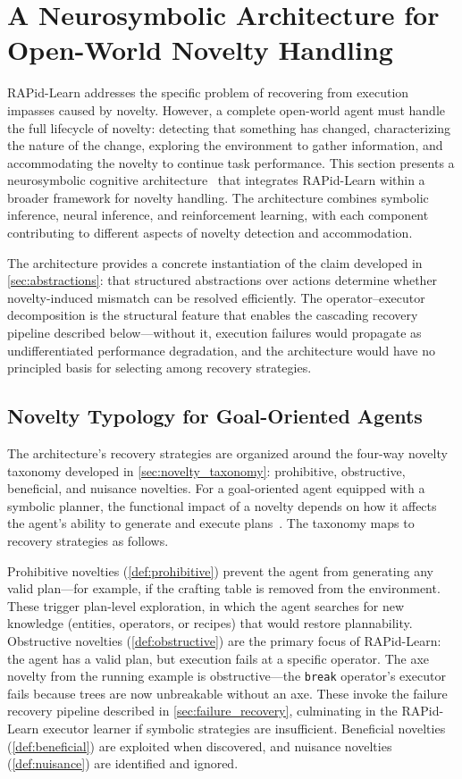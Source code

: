 \section{A Neurosymbolic Architecture for Open-World Novelty Handling}
\label{sec:architecture}

RAPid-Learn addresses the specific problem of recovering from execution impasses caused by novelty. However, a complete open-world agent must handle the full lifecycle of novelty: detecting that something has changed, characterizing the nature of the change, exploring the environment to gather information, and accommodating the novelty to continue task performance. This section presents a neurosymbolic cognitive architecture~\citep{goel2024neurosymbolic} that integrates RAPid-Learn within a broader framework for novelty handling. The architecture combines symbolic inference, neural inference, and reinforcement learning, with each component contributing to different aspects of novelty detection and accommodation.

The architecture provides a concrete instantiation of the claim developed in \cref{sec:abstractions}: that structured abstractions over actions determine whether novelty-induced mismatch can be resolved efficiently. The operator--executor decomposition is the structural feature that enables the cascading recovery pipeline described below---without it, execution failures would propagate as undifferentiated performance degradation, and the architecture would have no principled basis for selecting among recovery strategies.

\subsection{Novelty Typology for Goal-Oriented Agents}
\label{sec:novelty_typology}

The architecture's recovery strategies are organized around the four-way novelty taxonomy developed in \cref{sec:novelty_taxonomy}: prohibitive, obstructive, beneficial, and nuisance novelties. For a goal-oriented agent equipped with a symbolic planner, the functional impact of a novelty depends on how it affects the agent's ability to generate and execute plans~\citep{goel2024neurosymbolic}. The taxonomy maps to recovery strategies as follows.

Prohibitive novelties (\cref{def:prohibitive}) prevent the agent from generating any valid plan---for example, if the crafting table is removed from the environment. These trigger plan-level exploration, in which the agent searches for new knowledge (entities, operators, or recipes) that would restore plannability. Obstructive novelties (\cref{def:obstructive}) are the primary focus of RAPid-Learn: the agent has a valid plan, but execution fails at a specific operator. The axe novelty from the running example is obstructive---the \texttt{break} operator's executor fails because trees are now unbreakable without an axe. These invoke the failure recovery pipeline described in \cref{sec:failure_recovery}, culminating in the RAPid-Learn executor learner if symbolic strategies are insufficient. Beneficial novelties (\cref{def:beneficial}) are exploited when discovered, and nuisance novelties (\cref{def:nuisance}) are identified and ignored.


